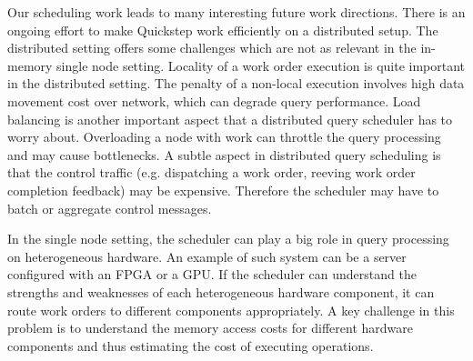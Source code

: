 Our scheduling work leads to many interesting future work directions.
There is an ongoing effort to make Quickstep work efficiently on a distributed setup. 
The distributed setting offers some challenges which are not as relevant in the in-memory single node setting.
Locality of a work order execution is quite important in the distributed setting.
The penalty of a non-local execution involves high data movement cost over network, which can degrade query performance.
Load balancing is another important aspect that a distributed query scheduler has to worry about.
Overloading a node with work can throttle the query processing and may cause bottlenecks.
A subtle aspect in distributed query scheduling is that the control traffic (e.g. dispatching a work order, reeving work order completion feedback) may be expensive.
Therefore the scheduler may have to batch or aggregate control messages.

In the single node setting, the scheduler can play a big role in query processing on heterogeneous hardware.
An example of such system can be a server configured with an FPGA or a GPU.
If the scheduler can understand the strengths and weaknesses of each heterogeneous hardware component, it can route work orders to different components appropriately. 
A key challenge in this problem is to understand the memory access costs for different hardware components and thus estimating the cost of executing operations.